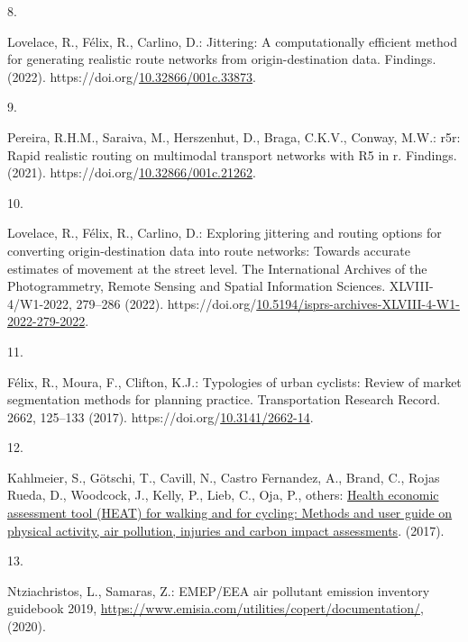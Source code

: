 \documentclass[runningheads]{llncs}
\newlength{\cslhangindent}
\newlength{\csllabelwidth}
\newlength{\cslentryspacingunit} %
\newenvironment{CSLReferences}[2] %
 {%
  \setlength{\parindent}{0pt}
  \ifodd #1
  \let\oldpar\par
  \def\par{\hangindent=\cslhangindent\oldpar}
  \fi
  \setlength{\parskip}{#2\cslentryspacingunit}
 }%
 {}
\newcommand{\CSLLeftMargin}[1]{\parbox[t]{\csllabelwidth}{#1}}
\newcommand{\CSLRightInline}[1]{\parbox[t]{\linewidth - \csllabelwidth}{#1}\break}
\begin{document}
\begin{CSLReferences}{0}{0}
\leavevmode{}%
\CSLLeftMargin{8. }%
\CSLRightInline{Lovelace, R., Félix, R., Carlino, D.: Jittering: A
computationally efficient method for generating realistic route networks
from origin-destination data. Findings. (2022).
https://doi.org/\href{https://doi.org/10.32866/001c.33873}{10.32866/001c.33873}.}

\leavevmode{}%
\CSLLeftMargin{9. }%
\CSLRightInline{Pereira, R.H.M., Saraiva, M., Herszenhut, D., Braga,
C.K.V., Conway, M.W.: r5r: Rapid realistic routing on multimodal
transport networks with R5 in r. Findings. (2021).
https://doi.org/\href{https://doi.org/10.32866/001c.21262}{10.32866/001c.21262}.}

\leavevmode{}%
\CSLLeftMargin{10. }%
\CSLRightInline{Lovelace, R., Félix, R., Carlino, D.: Exploring
jittering and routing options for converting origin-destination data
into route networks: Towards accurate estimates of movement at the
street level. The International Archives of the Photogrammetry, Remote
Sensing and Spatial Information Sciences. XLVIII-4/W1-2022, 279--286
(2022).
https://doi.org/\href{https://doi.org/10.5194/isprs-archives-XLVIII-4-W1-2022-279-2022}{10.5194/isprs-archives-XLVIII-4-W1-2022-279-2022}.}

\leavevmode{}%
\CSLLeftMargin{11. }%
\CSLRightInline{Félix, R., Moura, F., Clifton, K.J.: Typologies of urban
cyclists: Review of market segmentation methods for planning practice.
Transportation Research Record. 2662, 125--133 (2017).
https://doi.org/\href{https://doi.org/10.3141/2662-14}{10.3141/2662-14}.}

\leavevmode{}%
\CSLLeftMargin{12. }%
\CSLRightInline{Kahlmeier, S., Götschi, T., Cavill, N., Castro
Fernandez, A., Brand, C., Rojas Rueda, D., Woodcock, J., Kelly, P.,
Lieb, C., Oja, P., others:
\href{https://www.euro.who.int/__data/assets/pdf_file/0010/352963/Heat.pdf}{Health
economic assessment tool ({HEAT}) for walking and for cycling: Methods
and user guide on physical activity, air pollution, injuries and carbon
impact assessments}. (2017).}

\leavevmode{}%
\CSLLeftMargin{13. }%
\CSLRightInline{Ntziachristos, L., Samaras, Z.: {EMEP/EEA} air pollutant
emission inventory guidebook 2019,
\url{https://www.emisia.com/utilities/copert/documentation/}, (2020).}


\end{CSLReferences}
\end{document}
